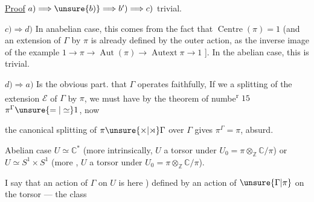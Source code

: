 


\uline{Proof} $a)\Longrightarrow\unsure{b)}\Longrightarrow b')\Longrightarrow c)$ trivial.

$c)\Longrightarrow d)$ In anabelian case, this comes
from the fact that $\operatorname{Centre}(\pi)=1$ (and an extension
of $\Gamma$ by $\pi$ is already defined by the outer
action,  as the inverse image
of the example $1\longrightarrow\pi\longrightarrow\operatorname{Aut}(\pi)
\longrightarrow\operatorname{Autext}\pi\longrightarrow1$ ].
In the abelian case, this is trivial.

$d)\Longrightarrow a)$ Is the  obvious part. 
  that $\Gamma$
operates faithfully, 
 
If we  a splitting of the extension
$\mathcal E$ of $\Gamma$ by $\pi$, we must have
by the theorem of numbe\textsuperscript{r} $15$ $\pi^\Gamma\unsure{=|\simeq}1$, now

the canonical splitting of $\pi\unsure{\times|\rtimes}\Gamma$ over $\Gamma$
gives $\pi^\Gamma=\pi$, absurd.

Abelian case $U\simeq\mathbb C^*$ (more intrinsically,
$U$ a torsor under $U_0=\pi\otimes_{\mathbb Z}\mathbb C/\pi$)
or $U\simeq S^1\times S^1$ (more ,
$U$ a torsor under $U_0=\pi\otimes_{\mathbb Z}\mathbb C/\pi$).

I say that an action of $\Gamma$ on $U$ is
here   ) defined by an action
of $\unsure{\Gamma|\pi}$ on the torsor --- the class



